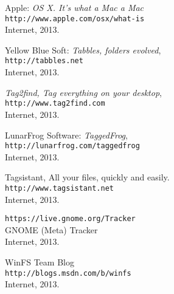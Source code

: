 \begin{thebibliography}{9}
Apple: \textit{OS X. It's what a Mac a Mac} \\
\texttt{http://www.apple.com/osx/what-is} \\
Internet, 2013.

Yellow Blue Soft: \emph{Tabbles, folders evolved}, \\
\texttt{http://tabbles.net} \\
Internet, 2013.

\emph{Tag2find, Tag everything on your desktop}, \\
\texttt{http://www.tag2find.com} \\
Internet, 2013.

LunarFrog Software: \emph{TaggedFrog}, \\
\texttt{http://lunarfrog.com/taggedfrog} \\
Internet, 2013.

Tagsistant, All your files, quickly and easily. \\
\texttt{http://www.tagsistant.net} \\
Internet, 2013.

\texttt{https://live.gnome.org/Tracker} \\
GNOME (Meta) Tracker \\
Internet, 2013.

WinFS Team Blog \\
\texttt{http://blogs.msdn.com/b/winfs} \\
Internet, 2013.

\end{thebibliography}

